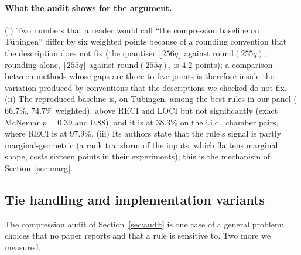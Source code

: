 \paragraph{What the audit shows for the argument.} (i) Two numbers that a reader would call ``the compression baseline on T\"ubingen'' differ by six weighted points because of a rounding convention that the description does not fix (the quantiser $\lfloor 256q\rfloor$ against $\mathrm{round}(255q)$; rounding alone, $\lfloor 255q\rfloor$ against $\mathrm{round}(255q)$, is $4.2$ points); a comparison between methods whose gaps are three to five points is therefore inside the variation produced by conventions that the descriptions we checked do not fix. (ii) The reproduced baseline is, on T\"ubingen, among the best rules in our panel ($66.7\%$, $74.7\%$ weighted), above RECI and LOCI but not significantly (exact McNemar $p=0.39$ and $0.88$), and it is at $38.3\%$ on the i.i.d.\ chamber pairs, where RECI is at $97.9\%$. (iii) Its authors state that the rule's signal is partly marginal-geometric (a rank transform of the inputs, which flattens marginal shape, costs sixteen points in their experiments); this is the mechanism of Section~\ref{sec:marg}.

\subsection{Tie handling and implementation variants}\label{sec:ties}

The compression audit of Section~\ref{sec:audit} is one case of a general problem: choices that no paper reports and that a rule is sensitive to. Two more we measured.

